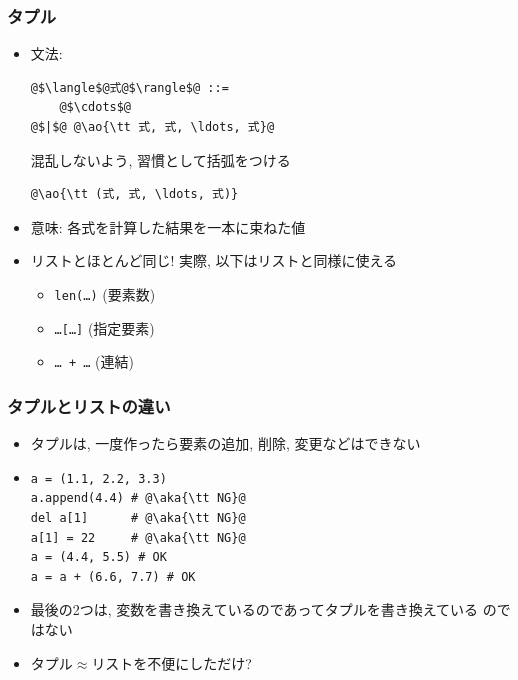 \documentclass[10pt,dvipdfmx]{beamer}
\newcommand{\ao}[1]{{\color{blue}#1}}
\newcommand{\aka}[1]{{\color{red}#1}}
\begin{document}
\begin{frame}[fragile]
\frametitle{タプル}
\begin{itemize}
\item 文法:
\begin{lstlisting}
@$\langle$@式@$\rangle$@ ::=
    @$\cdots$@
@$|$@ @\ao{\tt 式, 式, \ldots, 式}@
\end{lstlisting}
混乱しないよう, 習慣として括弧をつける
\begin{lstlisting}
@\ao{\tt (式, 式, \ldots, 式)}
\end{lstlisting}

\item 意味: 各式を計算した結果を一本に束ねた値
\item リストとほとんど同じ! 実際, 以下はリストと同様に使える
  \begin{itemize}
  \item {\tt len(\ldots)} (要素数)
  \item {\tt \ldots[\ldots]} (指定要素)
  \item {\tt \ldots\ + \ldots} (連結)
  \end{itemize}

\end{itemize}
\end{frame}

\begin{frame}[fragile]
\frametitle{タプルとリストの違い}
\begin{itemize}
\item タプルは, 一度作ったら要素の追加, 削除, 変更などはできない
\item 
\begin{lstlisting}
a = (1.1, 2.2, 3.3)
a.append(4.4) # @\aka{\tt NG}@
del a[1]      # @\aka{\tt NG}@
a[1] = 22     # @\aka{\tt NG}@
a = (4.4, 5.5) # OK
a = a + (6.6, 7.7) # OK
\end{lstlisting}
\item 最後の2つは, 変数を書き換えているのであってタプルを書き換えている
  のではない
\item タプル$\approx$リストを不便にしただけ?
\end{itemize}
\end{frame}
\end{document}
